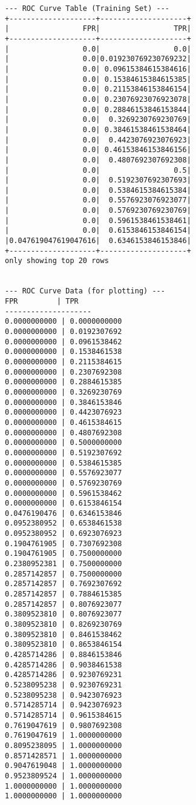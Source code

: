 \documentclass{article}
\begin{document}
\begin{verbatim}
--- ROC Curve Table (Training Set) ---
+--------------------+--------------------+
|                 FPR|                 TPR|
+--------------------+--------------------+
|                 0.0|                 0.0|
|                 0.0|0.019230769230769232|
|                 0.0| 0.09615384615384616|
|                 0.0| 0.15384615384615385|
|                 0.0| 0.21153846153846154|
|                 0.0| 0.23076923076923078|
|                 0.0| 0.28846153846153844|
|                 0.0|  0.3269230769230769|
|                 0.0| 0.38461538461538464|
|                 0.0|  0.4423076923076923|
|                 0.0| 0.46153846153846156|
|                 0.0|  0.4807692307692308|
|                 0.0|                 0.5|
|                 0.0|  0.5192307692307693|
|                 0.0|  0.5384615384615384|
|                 0.0|  0.5576923076923077|
|                 0.0|  0.5769230769230769|
|                 0.0|  0.5961538461538461|
|                 0.0|  0.6153846153846154|
|0.047619047619047616|  0.6346153846153846|
+--------------------+--------------------+
only showing top 20 rows


--- ROC Curve Data (for plotting) ---
FPR         | TPR
--------------------
0.0000000000 | 0.0000000000
0.0000000000 | 0.0192307692
0.0000000000 | 0.0961538462
0.0000000000 | 0.1538461538
0.0000000000 | 0.2115384615
0.0000000000 | 0.2307692308
0.0000000000 | 0.2884615385
0.0000000000 | 0.3269230769
0.0000000000 | 0.3846153846
0.0000000000 | 0.4423076923
0.0000000000 | 0.4615384615
0.0000000000 | 0.4807692308
0.0000000000 | 0.5000000000
0.0000000000 | 0.5192307692
0.0000000000 | 0.5384615385
0.0000000000 | 0.5576923077
0.0000000000 | 0.5769230769
0.0000000000 | 0.5961538462
0.0000000000 | 0.6153846154
0.0476190476 | 0.6346153846
0.0952380952 | 0.6538461538
0.0952380952 | 0.6923076923
0.1904761905 | 0.7307692308
0.1904761905 | 0.7500000000
0.2380952381 | 0.7500000000
0.2857142857 | 0.7500000000
0.2857142857 | 0.7692307692
0.2857142857 | 0.7884615385
0.2857142857 | 0.8076923077
0.3809523810 | 0.8076923077
0.3809523810 | 0.8269230769
0.3809523810 | 0.8461538462
0.3809523810 | 0.8653846154
0.4285714286 | 0.8846153846
0.4285714286 | 0.9038461538
0.4285714286 | 0.9230769231
0.5238095238 | 0.9230769231
0.5238095238 | 0.9423076923
0.5714285714 | 0.9423076923
0.5714285714 | 0.9615384615
0.7619047619 | 0.9807692308
0.7619047619 | 1.0000000000
0.8095238095 | 1.0000000000
0.8571428571 | 1.0000000000
0.9047619048 | 1.0000000000
0.9523809524 | 1.0000000000
1.0000000000 | 1.0000000000
1.0000000000 | 1.0000000000


\end{verbatim}
\end{document}
